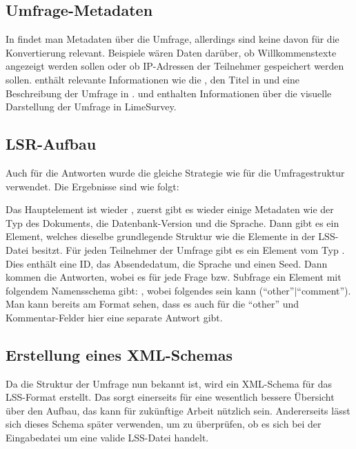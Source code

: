 \subsection{Umfrage-Metadaten}
\label{a:survey_meta}

In  findet man Metadaten über die Umfrage, allerdings sind keine davon für die Konvertierung relevant.
Beispiele wären Daten darüber, ob Willkommenstexte angezeigt werden sollen oder ob IP-Adressen der Teilnehmer gespeichert werden sollen.
 enthält relevante Informationen wie die , den Titel in  und eine Beschreibung der Umfrage in .
 und  enthalten Informationen über die visuelle Darstellung der Umfrage in LimeSurvey.

\subsection{LSR-Aufbau}

Auch für die Antworten wurde die gleiche Strategie wie für die Umfragestruktur verwendet.
Die Ergebnisse sind wie folgt:

Das Hauptelement ist wieder , zuerst gibt es wieder einige Metadaten wie der Typ des Dokuments, die Datenbank-Version und die Sprache.
Dann gibt es ein  Element, welches dieselbe grundlegende Struktur wie die Elemente in der LSS-Datei besitzt.
Für jeden Teilnehmer der Umfrage gibt es ein Element vom Typ .
Dies enthält eine ID, das Absendedatum, die Sprache und einen Seed.
Dann kommen die Antworten, wobei es für jede Frage bzw. Subfrage ein Element mit folgendem Namensschema gibt: , wobei  folgendes sein kann (\enquote{other}$\vert$\enquote{comment}).
Man kann bereits am Format sehen, dass es auch für die \enquote{other} und Kommentar-Felder hier eine separate Antwort gibt.

\subsection{Erstellung eines XML-Schemas}

Da die Struktur der Umfrage nun bekannt ist, wird ein XML-Schema für das LSS-Format erstellt.
Das sorgt einerseits für eine wesentlich bessere Übersicht über den Aufbau, das kann für zukünftige Arbeit nützlich sein.
Andererseits lässt sich dieses Schema später verwenden, um zu überprüfen, ob es sich bei der Eingabedatei um eine valide LSS-Datei handelt.

